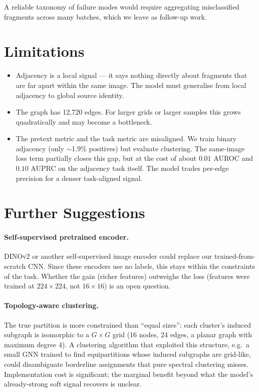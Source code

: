 \documentclass[12pt, a4paper]{article}
\begin{document}


A reliable taxonomy of failure modes would require aggregating misclassified
fragments across many batches, which we leave as follow-up work.


\section{Limitations}

\begin{itemize}
    \item Adjacency is a local signal — it says nothing directly about fragments that are
          far apart within the same image. The model must generalise from local adjacency
          to global source identity.
    \item The graph has 12,720 edges. For larger grids or larger samples this grows
          quadratically and may become a bottleneck.
    \item The pretext metric and the task metric are misaligned. We train binary
          adjacency (only $\sim$1.9\% positives) but evaluate clustering. The
          same-image loss term partially closes this gap, but at the cost
          of about $0.01$ AUROC and $0.10$ AUPRC on the adjacency task itself.
          The model trades per-edge precision for a denser task-aligned signal.
\end{itemize}

\section{Further Suggestions}

\paragraph{Self-supervised pretrained encoder.}
DINOv2 \parencite{moco2020} or another self-supervised image encoder could replace our
trained-from-scratch CNN. Since these encoders use no labels, this stays within the
constraints of the task. Whether the gain (richer features) outweighs the loss
(features were trained at $224 \times 224$, not $16 \times 16$) is an open question.

\paragraph{Topology-aware clustering.}
The true partition is more constrained than ``equal sizes'': each cluster's induced
subgraph is isomorphic to a $G \times G$ grid (16 nodes, 24 edges, a planar graph with
maximum degree 4). A clustering algorithm that exploited this structure, e.g.\ a small
GNN trained to find equipartitions whose induced subgraphs are grid-like, could
disambiguate borderline assignments that pure spectral clustering misses. Implementation
cost is significant; the marginal benefit beyond what the model's already-strong soft
signal recovers is unclear.
\end{document}
